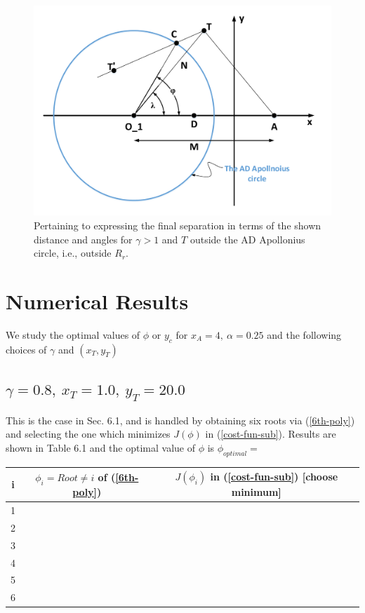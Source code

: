 \begin{figure}[H]
\centering
\includegraphics[width=1.0\textwidth]{fig/Drawing6_6.pdf}
\caption{Pertaining to expressing the final separation in terms of the shown distance and angles for $\gamma>1$ and $T$ outside the AD Apollonius circle, i.e., outside $R_r$.}
\label{6.6}
\end{figure}

\section{Numerical Results}
We study the optimal values of $\phi$ or $y_c$ for $x_A=4,\ \alpha=0.25$ and the following choices of $\gamma$ and $(x_T,y_T)$
\subsection{$\gamma=0.8,\ x_T=1.0,\ y_T=20.0$}
This is the case in Sec. 6.1, and is handled by obtaining six roots via (\ref{6th-poly}) and selecting the one which minimizes $J(\phi)$ in (\ref{cost-fun-sub}). Results are shown in Table 6.1 and the optimal value of $\phi$ is $\phi_{optimal}=$


\begin{center}
\begin{tabular}{ |c||c|c| } 
\hline
i & $\phi_i = Root\neq i$ of (\ref{6th-poly}) & $J(\phi_i)$ in (\ref{cost-fun-sub}) [choose minimum]  \\
 \hline
 \hline
 1 &  &  \\
 \hline 
 2 &  &  \\
 \hline 
 3 &  &  \\ 
 \hline
 4 &  &  \\
  \hline
  5&  &  \\ 
   \hline
   6 &  &  \\  
  \hline
\end{tabular}
\end{center}


